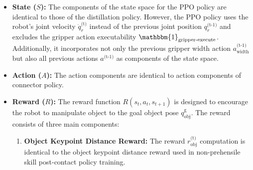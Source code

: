 \begin{itemize}
    \medskip
    \item \textbf{State (\( S \)):} The components of the state space for the PPO policy are identical to those of the distillation policy. However, the PPO policy uses the robot’s joint velocity $\dot{q}^\text{(t)}_r$ instead of the previous joint position $q^\text{(t-1)}_r$ and excludes the gripper action executability $\mathbbm{1}_\text{gripper-execute}$. Additionally, it incorporates not only the previous gripper width action $ a^\text{(t-1)}_\text{width}$ but also all previous actions $a^\text{(t-1)}$ as components of the state space.
    \medskip
    \item \textbf{Action (\( A \)):}
    The action components are identical to action components of connector policy. %

    \medskip
    \item \textbf{Reward (\( R \)):} The reward function \( R(s_t, a_t, s_{t+1}) \) is designed to encourage the robot to manipulate object to the goal object pose \( q_{\text{obj}}^\text{g} \). The reward consists of three main components:
    \begin{enumerate}

        \item \textbf{Object Keypoint Distance Reward:} The reward $r^\text{(t)}_\text{obj}$ computation is identical to the object keypoint distance reward used in non-prehensile skill post-contact policy training. %


\end{enumerate}
\end{itemize}
